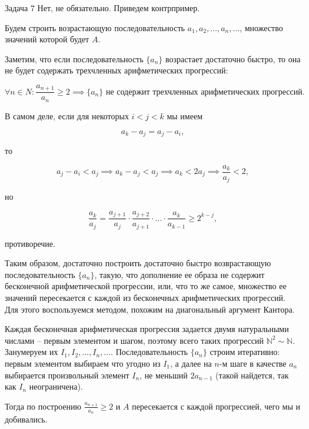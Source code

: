 \documentclass{article}
\newcommand{\N}{\mathbb{N}}
\begin{document}
	\begin{section}{Задача 7}
		Нет, не обязательно. Приведем контрпример.

		Будем строить возрастающую последовательность $a_1, a_2, \dots, a_n, \dots$, множество значений которой будет $A$.

		Заметим, что если последовательность $\{a_n\}$ возрастает достаточно быстро, то она не будет содержать трехчленных арифметических прогрессий:

		\begin{equation*}
			\forall n \in N: \frac{a_{n+1}}{a_n} \ge 2 \implies \{a_n\} \text{ не содержит трехчленных арифметических прогрессий}.
		\end{equation*}

		В самом деле, если для некоторых $i < j < k$ мы имеем

		\begin{equation*}
			a_k - a_j = a_j - a_i,
		\end{equation*}

		то

		\begin{equation*}
			a_j - a_i < a_j \implies a_k - a_j < a_j \implies a_k < 2 a_j \implies \frac{a_k}{a_j} < 2,
		\end{equation*}

		но

		\begin{equation*}
			\frac{a_k}{a_j} = \frac{a_{j+1}}{a_j} \cdot \frac{a_{j+2}}{a_{j+1}} \cdot \dots \cdot \frac{a_k}{a_{k-1}} \ge 2^{k-j},
		\end{equation*}

		противоречие.

		Таким образом, достаточно построить достаточно быстро возврастающую последовательность $\{a_n\}$, такую, что дополнение ее образа не содержит бесконечной арифметической прогрессии, или, что то же самое, множество ее значений пересекается с каждой из бесконечных арифметических прогрессий. Для этого воспользуемся методом, похожим на диагональный аргумент Кантора.

		Каждая бесконечная арифметическая прогрессия задается двумя натуральными числами -- первым элементом и шагом, поэтому всего таких прогрессий $\N^2 \sim \N$. Занумеруем их $I_1, I_2, \dots, I_n, \dots$. Последовательность $\{a_n\}$ строим итеративно: первым элементом выбираем что угодно из $I_1$, а далее на $n$-м шаге в качестве $a_n$ выбирается произвольный элемент $I_n$, не меньший $2 a_{n-1}$ (такой найдется, так как $I_n$ неограничена).

		Тогда по построению $\frac{a_{n+1}}{a_n} \ge 2$ и $A$ пересекается с каждой прогрессией, чего мы и добивались.
	\end{section}
\end{document}
